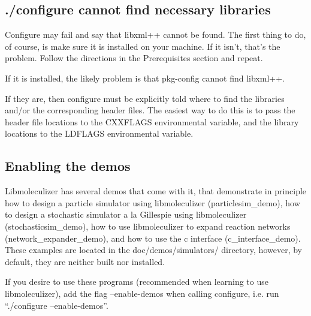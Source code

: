 \subsection{./configure cannot find necessary libraries}
Configure may fail and say that libxml++ cannot be found.  The first
thing to do, of course, is make sure it is installed on
your machine.  If it isn't, that's the problem.  Follow the directions
in the Prerequisites section and repeat.

If it is installed, the likely problem is that pkg-config cannot find
libxml++.  



If they are, then configure must be explicitly told
where to find the libraries and/or the corresponding header files. The
easiest way to do this is to pass the header file locations to the
CXXFLAGS environmental variable, and the library locations to the
LDFLAGS environmental variable.

\subsection{Enabling the demos}
Libmoleculizer has several demos that come with it, that demonstrate
in principle how to design a particle simulator using libmoleculizer
(particlesim\_demo), how to design a stochastic simulator a la
Gillespie using libmoleculizer (stochasticsim\_demo), how to use
libmoleculizer to expand reaction networks (network\_expander\_demo),
and how to use the c interface (c\_interface\_demo).  These examples are
located in the doc/demos/simulators/ directory, however, by default,
they are neither built nor installed.  

If you desire to use these programs (recommended when learning to use
libmoleculizer), add the flag --enable-demos when calling configure,
i.e. run ``./configure --enable-demos''.  

